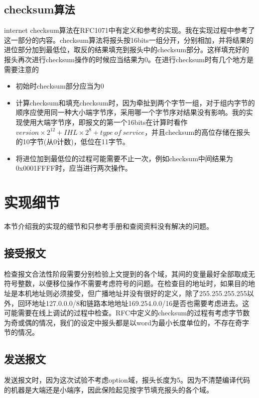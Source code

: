 \documentclass{article}
\begin{document}
\subsection{checksum算法}

internet checksum算法在RFC1071中有定义和参考的实现。我在实现过程中参考了这一部分的内容。checksum算法将报头按16bits一组分开，分别相加，并将结果的进位部分加到最低位，取反的结果填充到报头中的checksum部分。这样填充好的报头再次进行checksum操作的时候应当结果为0。在进行checksum时有几个地方是需要注意的
\begin{itemize}
    \item 初始时checksum部分应当为0
    \item 计算checksum和填充checksum时，因为牵扯到两个字节一组，对于组内字节的顺序应使用同一种大小端字节序，采用哪一个字节序对结果没有影响。我的实现使用大端字节序，即报文的第一个16bits在计算时看作 $version \times 2^{12} + IHL \times 2^{8} + type\ of\ service$，并且checksum的高位存储在报头的10字节(从0计数)，低位在11字节。
    \item 将进位加到最低位的过程可能需要不止一次，例如checksum中间结果为0x0001FFFF时，应当进行两次操作。
\end{itemize}

\section{实现细节}

本节介绍我的实现的细节和只参考手册和查阅资料没有解决的问题。

\subsection{接受报文}

检查报文合法性阶段需要分别检验上文提到的各个域，其间的变量最好全部取成无符号整数，以便移位操作不需要考虑符号的问题。在检查目的地址时，如果目的地址是本机地址则必须接受，但广播地址并没有很好的定义，除了255.255.255.255以外，回环地址127.0.0.0/8和链路本地地址169.254.0.0/16是否也需要考虑进去。这可能需要在线上调试的过程中检查。RFC中定义的checksum的过程有考虑字节数为奇或偶的情况，我们的设定中报头都是以word为最小长度单位的，不存在奇字节的情况。

\subsection{发送报文}

发送报文时，因为这次试验不考虑option域，报头长度为5。因为不清楚编译代码的机器是大端还是小端序，因此保险起见按字节填充报头的各个域。
\end{document}
